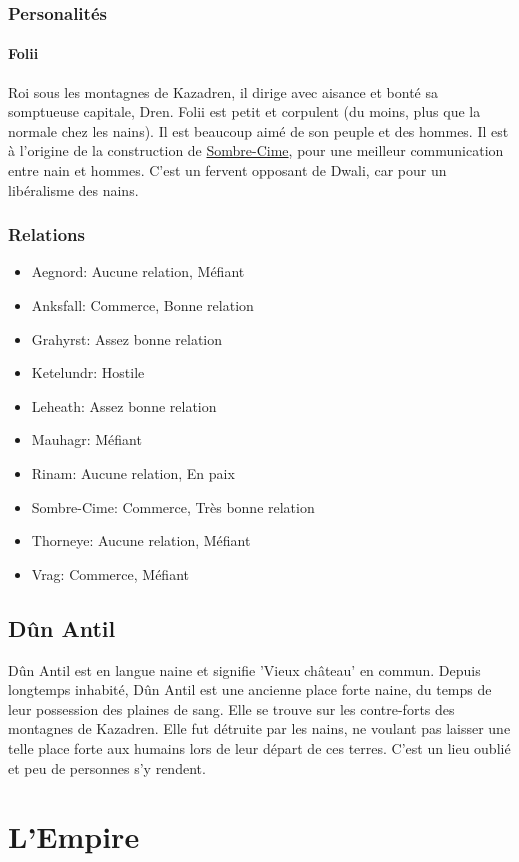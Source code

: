 \subsubsection{Personalités}
\paragraph{Folii}
\hypertarget {folii}{}Roi sous les montagnes de Kazadren, il dirige avec aisance et bonté sa somptueuse capitale, Dren.
Folii est petit et corpulent (du moins, plus que la normale chez les nains).
Il est beaucoup aimé de son peuple et des hommes. Il est à l'origine de la construction de \hyperlink {sombrecime}{Sombre-Cime}, pour une meilleur communication entre nain et hommes. 
C'est un fervent opposant de Dwali, car pour un libéralisme des nains.
\subsubsection{Relations}
\begin{itemize}
\item Aegnord: Aucune relation, Méfiant 
\item Anksfall: Commerce, Bonne relation 
\item Grahyrst: Assez bonne relation 
\item Ketelundr: Hostile 
\item Leheath: Assez bonne relation
\item Mauhagr: Méfiant 
\item Rinam: Aucune relation, En paix
\item Sombre-Cime: Commerce, Très bonne relation 
\item Thorneye: Aucune relation, Méfiant 
\item Vrag: Commerce, Méfiant 
\end{itemize}
\subsection{Dûn Antil}
Dûn Antil est en langue naine et signifie ’Vieux château’ en commun. Depuis longtemps inhabité, Dûn Antil est une ancienne place forte naine, du temps de leur possession des plaines de sang. Elle se trouve sur les contre-forts des montagnes de Kazadren. Elle fut détruite par les nains, ne voulant pas laisser une telle place forte aux humains lors de leur départ de ces terres. C’est un lieu oublié et peu de personnes s’y rendent. 
\section{L'Empire}
